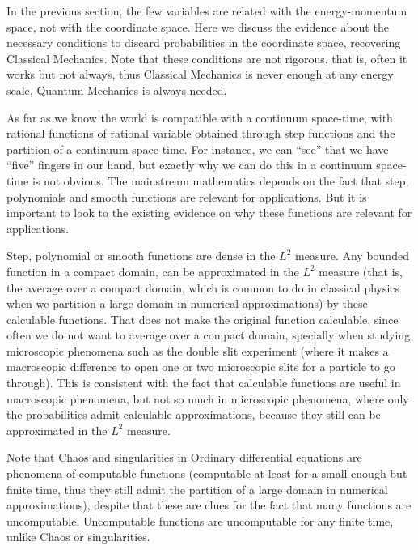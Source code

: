 \documentclass[11pt]{book}
\begin{document}
In the previous section, the few variables are related with the
energy-momentum space, not with the coordinate space. Here we discuss
the evidence about the necessary conditions to discard probabilities in
the coordinate space, recovering Classical Mechanics. Note that these
conditions are not rigorous, that is, often it works but not always,
thus Classical Mechanics is never enough at any energy scale, Quantum
Mechanics is always needed.

As far as we know the world is compatible with a continuum space-time,
with rational functions of rational variable obtained through step
functions and the partition of a continuum space-time. For instance, we
can ``see'' that we have ``five'' fingers in our hand, but exactly why
we can do this in a continuum space-time is not obvious. The mainstream
mathematics depends on the fact that step, polynomials and smooth
functions are relevant for applications. But it is important to look to
the existing evidence on why these functions are relevant for
applications.

Step, polynomial or smooth functions are dense in the \(L^2\) measure.
Any bounded function in a compact domain, can be approximated in the
\(L^2\) measure (that is, the average over a compact domain, which is
common to do in classical physics when we partition a large domain in
numerical approximations) by these calculable functions. That does not
make the original function calculable, since often we do not want to
average over a compact domain, specially when studying microscopic
phenomena such as the double slit experiment (where it makes a
macroscopic difference to open one or two microscopic slits for a
particle to go through). This is consistent with the fact that
calculable functions are useful in macroscopic phenomena, but not so
much in microscopic phenomena, where only the probabilities admit
calculable approximations, because they still can be approximated in the
\(L^2\) measure.

Note that Chaos and singularities in Ordinary differential equations are
phenomena of computable functions (computable at least for a small
enough but finite time, thus they still admit the partition of a large
domain in numerical approximations), despite that these are clues for
the fact that many functions are uncomputable. Uncomputable functions
are uncomputable for any finite time, unlike Chaos or singularities.

\hypertarget{r2820821913}{%
\section*{}\label{r2820821913}}
\end{document}
